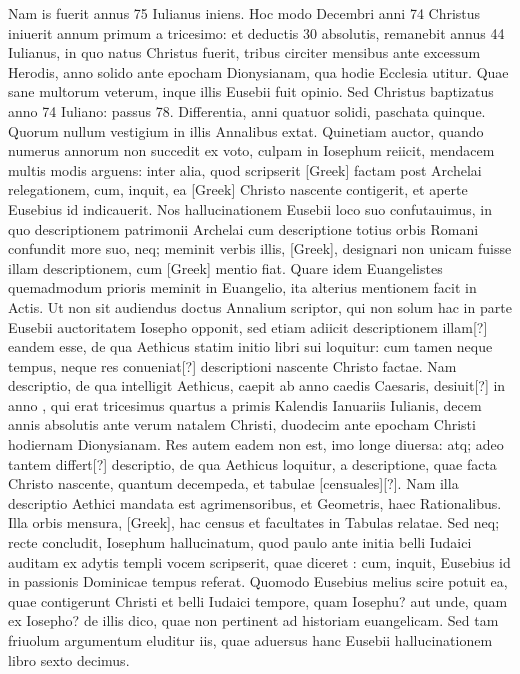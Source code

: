 Nam is fuerit annus 75 Iulianus iniens.
Hoc modo Decembri anni 74 Christus iniuerit annum primum a tricesimo: et
deductis 30 absolutis, remanebit annus 44 Iulianus, in quo natus
Christus fuerit, tribus circiter mensibus ante excessum Herodis, anno
solido ante epocham Dionysianam, qua hodie Ecclesia utitur.
Quae sane multorum veterum, inque illis Eusebii fuit opinio.
Sed
Christus baptizatus anno 74 Iuliano: passus 78.
Differentia, anni
quatuor solidi, paschata quinque.
Quorum nullum vestigium in illis
Annalibus extat.
Quinetiam auctor, quando numerus annorum
non succedit ex voto, culpam in Iosephum reiicit, mendacem multis
modis arguens: inter alia, quod scripserit \textgreek{[Greek]} factam post
Archelai relegationem, cum, inquit, ea \textgreek{[Greek]} Christo nascente
contigerit, et aperte Eusebius id indicauerit.
Nos hallucinationem
Eusebii loco suo confutauimus, in quo descriptionem patrimonii
Archelai cum descriptione totius orbis Romani confundit more
suo, neq; meminit verbis illis, \textgreek{[Greek]}, designari non
unicam fuisse illam descriptionem, cum \textgreek{[Greek]} mentio fiat.
Quare
idem Euangelistes quemadmodum prioris meminit in Euangelio,
ita alterius mentionem facit in Actis.
Ut non sit audiendus doctus Annalium
scriptor, qui non solum hac in parte Eusebii auctoritatem
Iosepho opponit, sed etiam adiicit descriptionem illam[?] eandem esse,
de qua Aethicus statim initio libri sui loquitur: cum tamen neque
tempus, neque res conueniat[?] descriptioni nascente Christo factae.
Nam descriptio, de qua intelligit Aethicus, caepit ab anno caedis
Caesaris, desiuit[?] in anno ,
 qui erat tricesimus quartus a primis
Kalendis Ianuariis Iulianis, decem annis absolutis ante verum
natalem Christi, duodecim ante epocham Christi hodiernam Dionysianam.
Res autem eadem non est, imo longe diuersa: atq; adeo
tantem differt[?] descriptio, de qua Aethicus loquitur, a descriptione,
quae facta Christo nascente, quantum decempeda, et tabulae [censuales][?].
Nam illa descriptio Aethici mandata est agrimensoribus, et
Geometris, haec Rationalibus.
Illa orbis mensura, \textgreek{[Greek]},
hac census et facultates in Tabulas relatae.
Sed neq; recte concludit,
Iosephum hallucinatum, quod paulo ante initia belli Iudaici
auditam ex adytis templi vocem scripserit, quae diceret : cum, inquit, Eusebius id in passionis Dominicae tempus
referat.
Quomodo Eusebius melius scire potuit ea, quae contigerunt
Christi et belli Iudaici tempore, quam Iosephu? aut unde,
quam ex Iosepho? de illis dico, quae non pertinent ad historiam euangelicam.
Sed tam friuolum argumentum eluditur iis, quae aduersus
hanc Eusebii hallucinationem libro sexto decimus.

